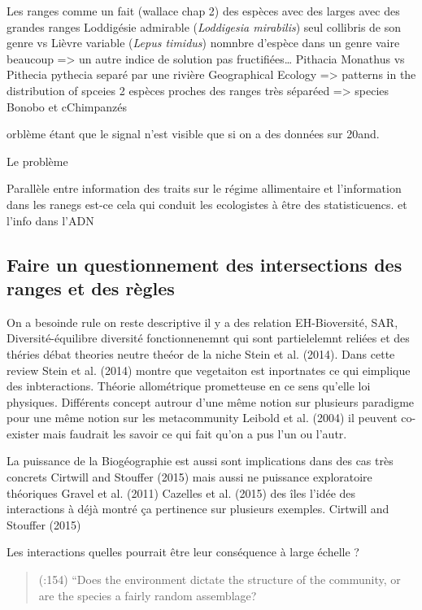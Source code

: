 Les ranges comme un fait (wallace chap 2) des espèces avec des larges
avec des grandes ranges Loddigésie admirable (\emph{Loddigesia
mirabilis}) seul collibris de son genre vs Lièvre variable (\emph{Lepus
timidus}) nomnbre d'espèce dans un genre vaire beaucoup =\textgreater{}
un autre indice de solution pas fructifiées\ldots{} Pithacia Monathus vs
Pithecia pythecia separé par une rivière Geographical Ecology
=\textgreater{} patterns in the distribution of spceies 2 espèces
proches des ranges très séparéed =\textgreater{} species Bonobo et
cChimpanzés

orblème étant que le signal n'est visible que si on a des données sur
20and.

Le problème

Parallèle entre information des traits sur le régime allimentaire et
l'information dans les ranegs est-ce cela qui conduit les ecologistes à
être des statisticuencs. et l'info dans l'ADN

\subsection{Faire un questionnement des intersections des ranges et des
règles}\label{faire-un-questionnement-des-intersections-des-ranges-et-des-ruxe8gles}

On a besoinde rule on reste descriptive il y a des relation
EH-Bioversité, SAR, Diversité-équilibre diversité fonctionnenemnt qui
sont partielelemnt reliées et des théries débat theories neutre theéor
de la niche Stein et al. (2014). Dans cette review Stein et al. (2014)
montre que vegetaiton est inportnates ce qui eimplique des
inbteractions. Théorie allométrique prometteuse en ce sens qu'elle loi
physiques. Différents concept autrour d'une même notion sur plusieurs
paradigme pour une même notion sur les metacommunity Leibold et al.
(2004) il peuvent co-exister mais faudrait les savoir ce qui fait qu'on
a pus l'un ou l'autr.

La puissance de la Biogéographie est aussi sont implications dans des
cas très concrets Cirtwill and Stouffer (2015) mais aussi ne puissance
exploratoire théoriques Gravel et al. (2011) Cazelles et al. (2015) des
îles l'idée des interactions à déjà montré ça pertinence sur plusieurs
exemples. Cirtwill and Stouffer (2015)

Les interactions quelles pourrait être leur conséquence à large échelle
?

\begin{quote}
(:154) ``Does the environment dictate the structure of the community, or
are the species a fairly random assemblage?
\end{quote}

